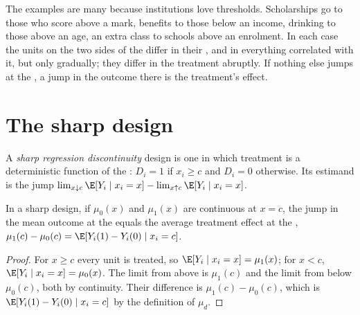The examples are many because institutions love thresholds. Scholarships go to
those who score above a mark, benefits to those below an income, drinking to
those above an age, an extra class to schools above an enrolment. In each case
the units on the two sides of the  differ in their , and
in everything correlated with it, but only gradually; they differ in the
treatment abruptly. If nothing else jumps at the , a jump in the outcome
there is the treatment's effect.

\section{The sharp design}\label{sec:b3:regression-discontinuity:sharp}

\begin{definition}\label{def:b3:regression-discontinuity:sharp}
A \emph{sharp regression discontinuity} design is one in which treatment is a
deterministic function of the : $D_i = 1$ if $x_i \ge c$ and
$D_i = 0$ otherwise. Its estimand is the jump $\lim_{x \downarrow c} \E[Y_i
\mid x_i = x] - \lim_{x \uparrow c} \E[Y_i \mid x_i = x]$.
\end{definition}

\begin{proposition}\label{prop:b3:regression-discontinuity:continuity}
In a sharp design, if $\mu_0(x)$ and $\mu_1(x)$ are continuous at $x = c$, the
jump in the mean outcome at the  equals the average treatment effect at
the , $\mu_1(c) - \mu_0(c) = \E[Y_i(1) - Y_i(0) \mid x_i = c]$.
\end{proposition}

\begin{proof}
For $x \ge c$ every unit is treated, so $\E[Y_i \mid x_i = x] = \mu_1(x)$; for $x <
c$, $\E[Y_i \mid x_i = x] = \mu_0(x)$. The limit from above is $\mu_1(c)$ and
the limit from below $\mu_0(c)$, both by continuity. Their difference is
$\mu_1(c) - \mu_0(c)$, which is $\E[Y_i(1) - Y_i(0) \mid x_i = c]$ by the
definition of $\mu_d$.
\end{proof}

